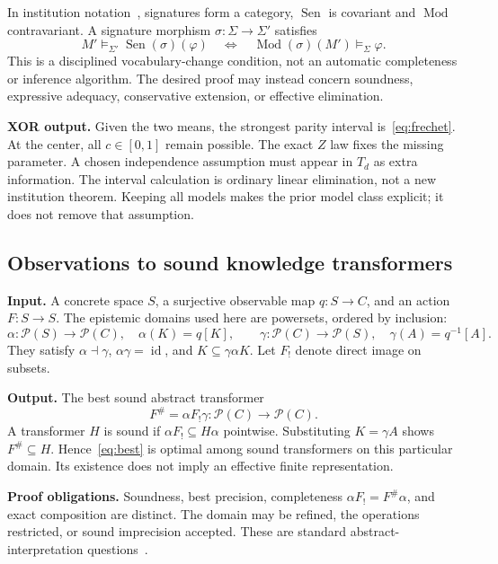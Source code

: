 \documentclass[11pt]{article}
\theoremstyle{definition}
\newcommand{\Pow}{\mathcal P}
\newcommand{\id}{\operatorname{id}}
\newcommand{\Mod}{\operatorname{Mod}}
\newcommand{\Sen}{\operatorname{Sen}}
\begin{document}
In institution notation~\cite{GoguenBurstall}, signatures form a category, $\Sen$ is covariant and $\Mod$ contravariant. A signature morphism $\sigma:\Sigma\to\Sigma'$ satisfies
\[
 M'\models_{\Sigma'}\Sen(\sigma)(\varphi)
 \quad\Longleftrightarrow\quad
 \Mod(\sigma)(M')\models_\Sigma\varphi.
\]
This is a disciplined vocabulary-change condition, not an automatic completeness or inference algorithm. The desired proof may instead concern soundness, expressive adequacy, conservative extension, or effective elimination.

\textbf{XOR output.} Given the two means, the strongest parity interval is~\eqref{eq:frechet}. At the center, all $c\in[0,1]$ remain possible. The exact $Z$ law fixes the missing parameter. A chosen independence assumption must appear in $T_d$ as extra information. The interval calculation is ordinary linear elimination, not a new institution theorem. Keeping all models makes the prior model class explicit; it does not remove that assumption.

\subsection{Observations to sound knowledge transformers}
\textbf{Input.} A concrete space $S$, a surjective observable map $q:S\to C$, and an action $F:S\to S$. The epistemic domains used here are powersets, ordered by inclusion:
\[
 \alpha:\Pow(S)\to\Pow(C),\quad \alpha(K)=q[K],\qquad
 \gamma:\Pow(C)\to\Pow(S),\quad\gamma(A)=q^{-1}[A].
\]
They satisfy $\alpha\dashv\gamma$, $\alpha\gamma=\id$, and $K\subseteq\gamma\alpha K$. Let $F_!$ denote direct image on subsets.

\textbf{Output.} The best sound abstract transformer
\begin{equation}\label{eq:best}
 F^\#=\alpha F_!\gamma:\Pow(C)\longrightarrow\Pow(C).
\end{equation}
A transformer $H$ is sound if $\alpha F_!\subseteq H\alpha$ pointwise. Substituting $K=\gamma A$ shows $F^\#\subseteq H$. Hence~\eqref{eq:best} is optimal among sound transformers on this particular domain. Its existence does not imply an effective finite representation.

\textbf{Proof obligations.} Soundness, best precision, completeness $\alpha F_!=F^\#\alpha$, and exact composition are distinct. The domain may be refined, the operations restricted, or sound imprecision accepted. These are standard abstract-interpretation questions~\cite{CousotCousot,GiacobazziRanzatoScozzari}.
\end{document}
